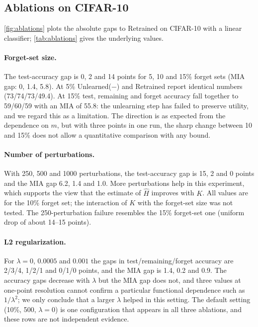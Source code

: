 \documentclass[10pt,twocolumn,letterpaper]{article}
\begin{document}


\subsection{Ablations on CIFAR-10}
\label{sec:ablations}
\cref{fig:ablations} plots the absolute gaps to Retrained on CIFAR-10 with a linear classifier; \cref{tab:ablations} gives the underlying values.

\paragraph{Forget-set size.}
The test-accuracy gap is 0, 2 and 14 points for 5, 10 and 15\% forget sets (MIA gap: 0, 1.4, 5.8).
At 5\% Unlearned($-$) and Retrained report identical numbers (73/74/73/49.4).
At 15\% test, remaining and forget accuracy fall together to 59/60/59 with an MIA of 55.8: the unlearning step has failed to preserve utility, and we regard this as a limitation.
The direction is as expected from the dependence on $m$, but with three points in one run, the sharp change between 10 and 15\% does not allow a quantitative comparison with any bound.



\paragraph{Number of perturbations.}
With 250, 500 and 1000 perturbations, the test-accuracy gap is 15, 2 and 0 points and the MIA gap 6.2, 1.4 and 1.0.
More perturbations help in this experiment, which supports the view that the estimate of $\hat H$ improves with $K$.
All values are for the 10\% forget set; the interaction of $K$ with the forget-set size was not tested.
The 250-perturbation failure resembles the 15\% forget-set one (uniform drop of about 14--15 points).

\paragraph{L2 regularization.}
For $\lambda=0$, $0.0005$ and $0.001$ the gaps in test/remaining/forget accuracy are 2/3/4, 1/2/1 and 0/1/0 points, and the MIA gap is 1.4, 0.2 and 0.9.
The accuracy gaps decrease with $\lambda$ but the MIA gap does not, and three values at one-point resolution cannot confirm a particular functional dependence such as $1/\lambda^2$; we only conclude that a larger $\lambda$ helped in this setting.
The default setting (10\%, 500, $\lambda=0$) is one configuration that appears in all three ablations, and these rows are not independent evidence.
\end{document}
